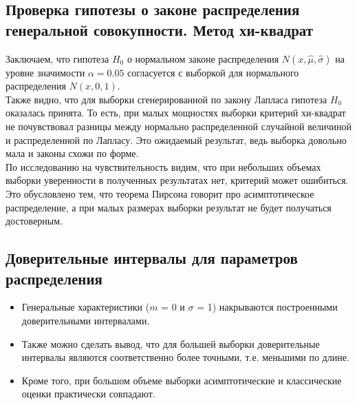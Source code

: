 \subsection{Проверка гипотезы о законе распределения генеральной совокупности. Метод хи-квадрат}
\begin{flushleft}
	Заключаем, что гипотеза $H_{0}$ о нормальном законе распределения $N(x,\hat{\mu}, \hat{\sigma})$ на уровне значимости $\alpha = 0.05$ согласуется с выборкой для нормального распределения $N(x, 0, 1)$.\\
	Также видно, что для выборки сгенерированной по закону Лапласа гипотеза $H_{0}$ оказалась принята. То есть, при малых мощностях выборки критерий хи-квадрат не почувствовал разницы между нормально распределенной случайной величиной и распределенной по Лапласу. Это ожидаемый результат,
	ведь выборка довольно мала и законы схожи по форме.\\
	По исследованию на чувствительность видим, что при небольших объемах выборки уверенности в полученных результатах нет, критерий может ошибиться. Это обусловлено тем, что теорема Пирсона говорит	про асимптотическое распределение, а при малых размерах выборки
	результат не будет получаться достоверным.
\end{flushleft}

\subsection{Доверительные интервалы для параметров распределения}
\begin{flushleft}
	 \begin{itemize}
		\item Генеральные характеристики ($m$ = 0 и $\sigma$ = 1) накрываются построенными доверительными интервалами. 
		\item Также можно сделать вывод, что для большей выборки доверительные интервалы являются соответственно более точными, т.е. меньшими по длине. 
		\item Кроме того, при большом объеме выборки асимптотические и классические оценки практически совпадают.
	\end{itemize}
\end{flushleft}
